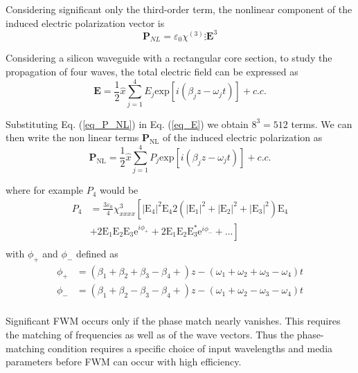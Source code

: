\documentclass[12pt,a4paper,twoside]{article}
\begin{document}
Considering significant only the third-order term, the nonlinear component of the induced electric polarization vector is
\begin{equation}
	\textbf{P}_{NL} = \varepsilon_0 \chi^{(3)} \vdots \textbf{E}^3
	\label{eq_P_NL}
\end{equation}

Considering a silicon waveguide with a rectangular core section, to study the propagation of four waves, the total electric field can be expressed as
\begin{equation}
	\textbf{E} = \frac{1}{2}\hat{x} \sum_{j=1}^4 E_j \mathrm{exp}[i(\beta_j z - \omega_j t)] + c.c.
	\label{eq_E}
\end{equation}

Substituting Eq. (\ref{eq_P_NL}) in Eq. (\ref{eq_E}) we obtain $8^3=512$ terms.
We can then write the non linear terms $\mathrm{\textbf{P}_{NL}}$ of the induced electric polarization as
\begin{equation}
	\mathrm{\textbf{P}_{NL}} = \frac{1}{2}\hat{x} \sum_{j=1}^4 P_j \mathrm{exp}[i(\beta_j z - \omega_j t)] + c.c.
	\label{eq_P}
\end{equation}

where for example $P_4$ would be
\[
\begin{array}{rl}
	P_4 &= \frac{3\varepsilon_0}{4} \chi^3_{xxxx}\left[ |\mathrm{E}_4|^2\mathrm{E}_4 2(|\mathrm{E}_1|^2+|\mathrm{E}_2|^2+|\mathrm{E}_3|^2)\mathrm{E}_4 \right. \\
	&+ \left. 2\mathrm{E}_1\mathrm{E}_2\mathrm{E}_3\mathrm{e}^{i\phi_+}+2\mathrm{E}_1\mathrm{E}_2\mathrm{E}_3^*\mathrm{e}^{i\phi_-} + ...\right]\\

\end{array}
\]
\hspace{18pt}with $\phi_+$ and $\phi_-$ defined as
\[
\begin{array}{lr}
\phi_+ &= (\beta_1+\beta_2+\beta_3-\beta_4+)z - (\omega_1+\omega_2+\omega_3-\omega_4)t \\
\phi_- &= (\beta_1+\beta_2-\beta_3-\beta_4+)z - (\omega_1+\omega_2-\omega_3-\omega_4)t \\
\end{array}
\]

Significant FWM occurs only if the phase match nearly vanishes.
This requires the matching of frequencies as well as of the wave vectors.
Thus the phase-matching condition requires a specific choice of input wavelengths and media parameters before FWM can occur with high efficiency.
\end{document}
